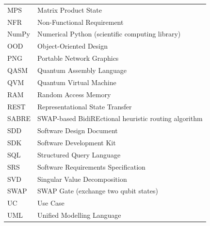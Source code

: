 \begin{longtable}{p{3.5cm} p{10cm}}
MPS   & Matrix Product State \\
NFR   & Non-Functional Requirement \\
NumPy & Numerical Python (scientific computing library) \\
OOD   & Object-Oriented Design \\
PNG   & Portable Network Graphics \\
QASM  & Quantum Assembly Language \\
QVM   & Quantum Virtual Machine \\
RAM   & Random Access Memory \\
REST  & Representational State Transfer \\
SABRE & SWAP-based BidiREctional heuristic routing algorithm \\
SDD   & Software Design Document \\
SDK   & Software Development Kit \\
SQL   & Structured Query Language \\
SRS   & Software Requirements Specification \\
SVD   & Singular Value Decomposition \\
SWAP  & SWAP Gate (exchange two qubit states) \\
UC    & Use Case \\
UML   & Unified Modelling Language \\
\end{longtable}
